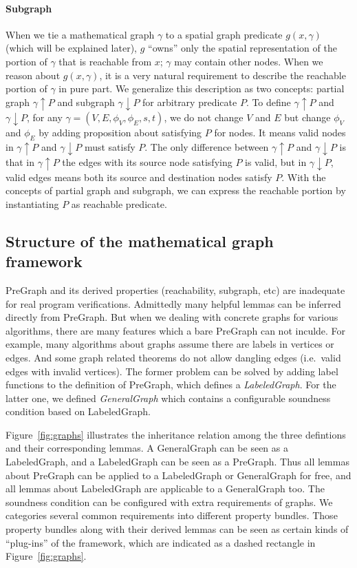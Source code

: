 \paragraph{Subgraph}
When we tie a mathematical graph $\gamma$ to a spatial graph predicate
$g(x, \gamma)$ (which will be explained later), $g$ ``owns'' only the
spatial representation of the portion of $\gamma$ that is reachable
from $x$; $\gamma$ may contain other nodes. When we reason about
$g(x, \gamma)$, it is a very natural requirement to describe the
reachable portion of $\gamma$ in pure part. We generalize this
description as two concepts: partial graph $\gamma \!\uparrow\! P$ and
subgraph $\gamma \!\downarrow\! P$ for arbitrary predicate $P$. To define
$\gamma \!\uparrow\! P$ and $\gamma \!\downarrow\! P$, for any $\gamma=(V,
E, \phi_V, \phi_E, s, t)$, we do not change $V$ and $E$ but change
$\phi_V$ and $\phi_E$ by adding proposition about satisfying $P$ for
nodes. It means valid nodes in $\gamma \!\uparrow\! P$ and
$\gamma \!\downarrow\! P$ must satisfy $P$. The only difference between
$\gamma \!\uparrow\! P$ and $\gamma \!\downarrow\! P$ is that in
$\gamma \!\uparrow\! P$ the edges with its source node satisfying $P$ is
valid, but in $\gamma \!\downarrow\! P$, valid edges means both its source
and destination nodes satisfy $P$. With the concepts of partial graph
and subgraph, we can express the reachable portion by instantiating
$P$ as reachable predicate.

\subsection{Structure of the mathematical graph framework}\label{sec:mathinfra}

PreGraph and its derived properties (reachability, subgraph, etc) are
inadequate for real program verifications. Admittedly many helpful
lemmas can be inferred directly from PreGraph. But when we dealing
with concrete graphs for various algorithms, there are many features
which a bare PreGraph can not inculde. For example, many algorithms
about graphs assume there are labels in vertices or edges. And some
graph related theorems do not allow dangling edges (i.e.\ valid edges
with invalid vertices). The former problem can be solved by adding
label functions to the definition of PreGraph, which defines
a \emph{LabeledGraph}. For the latter one, we
defined \emph{GeneralGraph} which contains a configurable soundness
condition based on LabeledGraph.

Figure~\ref{fig:graphs} illustrates the inheritance relation among the
three defintions and their corresponding lemmas. A GeneralGraph can be
seen as a LabeledGraph, and a LabeledGraph can be seen as a
PreGraph. Thus all lemmas about PreGraph can be applied to a
LabeledGraph or GeneralGraph for free, and all lemmas about
LabeledGraph are applicable to a GeneralGraph too. The soundness
condition can be configured with extra requirements of graphs. We
categories several common requirements into different property
bundles. Those property bundles along with their derived lemmas can be
seen as certain kinds of ``plug-ins'' of the framework, which are
indicated as a dashed rectangle in Figure~\ref{fig:graphs}.

